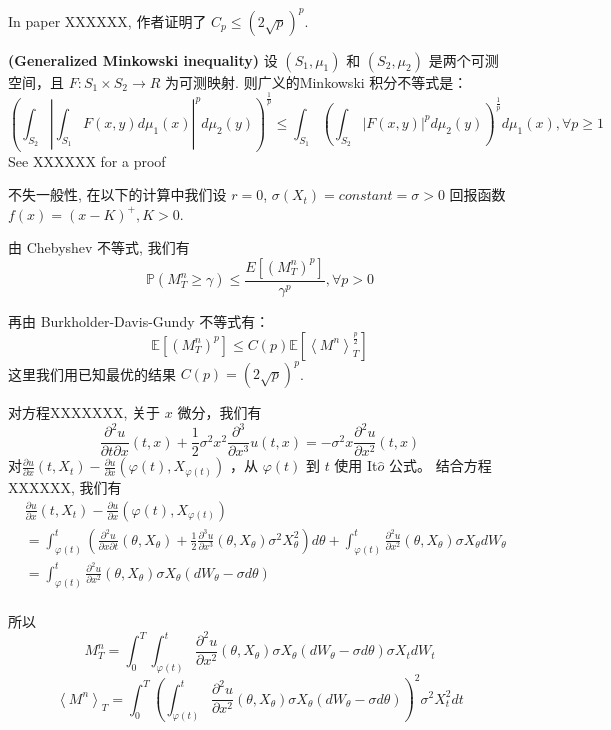 In paper XXXXXX, 作者证明了 $C_p\leq (2\sqrt{p})^p$.

\textbf{(Generalized Minkowski inequality)}
设 $(S_1,\mu_1)$ 和 $(S_2,\mu_2)$ 是两个可测空间，且 $F : S_1\times S_2\rightarrow R$ 为可测映射. 
则广义的Minkowski 积分不等式是：
\begin{equation}
(\int_{S_2}|\int_{S_1}F(x,y)d\mu_1(x)|^pd\mu_2(y))^{\frac{1}{p}}\leq \int_{S_1}(\int_{S_2}|F(x,y)|^pd\mu_2(y))^{\frac{1}{p}}d\mu_1(x), \forall p\geq 1
\end{equation}
See XXXXXX for a proof

不失一般性, 在以下的计算中我们设 $r=0$, $\sigma(X_t)=constant=\sigma>0$ 回报函数 $f(x)=(x-K)^{+}, K>0$.  

由 Chebyshev 不等式, 我们有 
$$\mathbb{P}(M_T^n\geq \gamma)\leq \frac{E[(M_T^n)^p]}{\gamma^p}, \forall p>0$$

再由 Burkholder-Davis-Gundy 不等式有： 
\[
\mathbb{E}[(M_T^n)^p]\leq C(p)\mathbb{E}[\left \langle M^n \right \rangle_T^{\frac{p}{2}}]
\]
这里我们用已知最优的结果 $C(p)=(2\sqrt{p})^p$.

对方程XXXXXXX, 关于 $x$ 微分，我们有
\begin{equation}
\frac{\partial^2 u}{\partial t \partial x}(t, x) +\frac{1}{2}\sigma^2x^2\frac{\partial^3}{\partial x^3}u(t,x)=
-\sigma^2x\frac{\partial^2u}{\partial x^2}(t, x)
\end{equation}
对$\frac{\partial u}{\partial x}(t, X_t)-\frac{\partial u}{\partial x}(\varphi(t), X_{\varphi(t)})$ ，从 $\varphi(t)$ 到 $t$ 使用 It$\hat{o}$ 公式。
结合方程 XXXXXX, 我们有
\[
\begin{split}
&\frac{\partial u}{\partial x}(t, X_t)-\frac{\partial u}{\partial x}(\varphi(t), X_{\varphi(t)})\\
&=\int_{\varphi(t)}^t (\frac{\partial^2 u}{\partial x\partial t}(\theta, 
X_\theta)+\frac{1}{2}\frac{\partial^3 u}{\partial x^3}(\theta, X_\theta)\sigma^2X^2_\theta) d\theta
+ \int_{\varphi(t)}^t \frac{\partial^2 u}{\partial x^2}(\theta, X_\theta)\sigma X_\theta dW_\theta\\
&=  \int_{\varphi(t)}^t \frac{\partial^2 u}{\partial x^2}(\theta, X_\theta)\sigma X_\theta (dW_\theta-\sigma d\theta)\\
\end{split}
\]

所以
\[
M_T^n=\int_0^T\int_{\varphi(t)}^t \frac{\partial^2 u}{\partial x^2}(\theta, X_\theta)\sigma X_\theta (dW_\theta-\sigma d\theta)\sigma X_t dW_t
\]
\[
\left \langle M^n \right \rangle_T=\int_0^T(\int_{\varphi(t)}^t \frac{\partial^2 u}{\partial x^2}(\theta, X_\theta)\sigma X_\theta (dW_\theta-\sigma d\theta))^2\sigma^2 X_t^2 dt
\]

